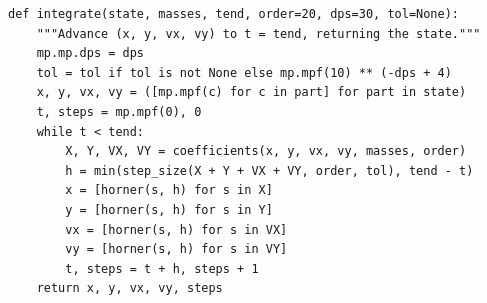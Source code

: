 \begin{verbatim}
def integrate(state, masses, tend, order=20, dps=30, tol=None):
    """Advance (x, y, vx, vy) to t = tend, returning the state."""
    mp.mp.dps = dps
    tol = tol if tol is not None else mp.mpf(10) ** (-dps + 4)
    x, y, vx, vy = ([mp.mpf(c) for c in part] for part in state)
    t, steps = mp.mpf(0), 0
    while t < tend:
        X, Y, VX, VY = coefficients(x, y, vx, vy, masses, order)
        h = min(step_size(X + Y + VX + VY, order, tol), tend - t)
        x = [horner(s, h) for s in X]
        y = [horner(s, h) for s in Y]
        vx = [horner(s, h) for s in VX]
        vy = [horner(s, h) for s in VY]
        t, steps = t + h, steps + 1
    return x, y, vx, vy, steps
\end{verbatim}
